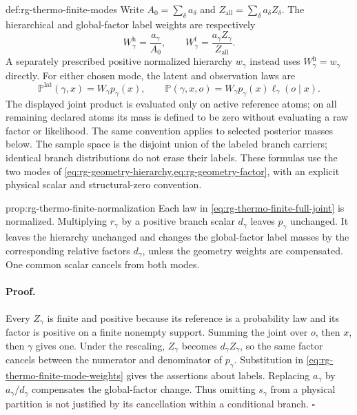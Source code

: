 {def:rg-thermo-finite-modes}
Write $A_0=\sum_\delta a_\delta$ and
$Z_{\mathrm{all}}=\sum_\delta a_\delta Z_\delta$. The hierarchical and
global-factor label weights are respectively
\begin{equation}
 W_\gamma^{\mathrm h}=\frac{a_\gamma}{A_0},
 \qquad
 W_\gamma^{\mathrm f}=\frac{a_\gamma Z_\gamma}{Z_{\mathrm{all}}}.
 \label{eq:rg-thermo-finite-mode-weights}
\end{equation}
A separately prescribed positive normalized hierarchy $w_\gamma$ instead
uses $W_\gamma^{\mathrm h}=w_\gamma$ directly. For either chosen mode,
the latent and observation laws are
\begin{equation}
 \mathbb P^{\mathrm{lat}}(\gamma,x)=W_\gamma p_\gamma(x),
 \qquad
 \mathbb P(\gamma,x,o)=W_\gamma p_\gamma(x)
                           \ell_\gamma(o\mid x).
 \label{eq:rg-thermo-finite-full-joint}
\end{equation}
The displayed joint product is evaluated only on active reference atoms;
on all remaining declared atoms its mass is defined to be zero without
evaluating a raw factor or likelihood. The same convention applies to
selected posterior masses below.
The sample space is the disjoint union of the labeled branch carriers;
identical branch distributions do not erase their labels. These formulas
use the two modes of
\cref{eq:rg-geometry-hierarchy,eq:rg-geometry-factor}, with an explicit
physical scalar and structural-zero convention. 

{prop:rg-thermo-finite-normalization}
Each law in \cref{eq:rg-thermo-finite-full-joint} is normalized.
Multiplying $r_\gamma$ by a positive branch scalar $d_\gamma$ leaves
$p_\gamma$ unchanged. It leaves the hierarchy unchanged and changes the
global-factor label masses by the corresponding relative factors
$d_\gamma$, unless the geometry weights are compensated. One common
scalar cancels from both modes.\thermoestablishedstatus


\paragraph{Proof.}
Every $Z_\gamma$ is finite and positive because its reference is a
probability law and its factor is positive on a finite nonempty support.
Summing the joint over $o$, then $x$, then $\gamma$ gives one. Under the
rescaling, $Z_\gamma$ becomes $d_\gamma Z_\gamma$, so the same factor
cancels between the numerator and denominator of $p_\gamma$. Substitution
in \cref{eq:rg-thermo-finite-mode-weights} gives the assertions about
labels. Replacing $a_\gamma$ by $a_\gamma/d_\gamma$ compensates the
global-factor change. Thus omitting $s_\gamma$ from a physical partition
is not justified by its cancellation within a conditional branch.
$\square$

